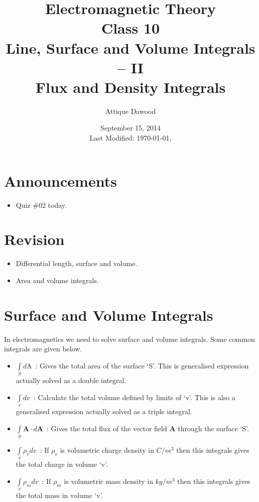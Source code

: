 \documentclass[12pt,a4paper]{article}
\title{Electromagnetic Theory\\Class 10\\Line, Surface and Volume Integrals -- II\\Flux and Density Integrals}
\author{Attique Dawood}
\date{September 15, 2014\\[0.2cm] Last Modified: \today, \currenttime}
\begin{document}
\maketitle
\section{Announcements}
\begin{itemize}
\item Quiz \#02 today.
\end{itemize}
\section{Revision}
\begin{itemize}
\item Differential length, surface and volume.
\item Area and volume integrals.
\end{itemize}
\section{Surface and Volume Integrals}
In electromagnetics we need to solve surface and volume integrals. Some common integrals are given below.
\begin{itemize}
\item $\int\limits_{S} d\mathrm{A}$~: Gives the total area of the surface `S'. This is generalised expression actually solved as a double integral.
\item $\int\limits_{v} dv$~: Calculate the total volume defined by limits of `v'. This is also a generalised expression actually solved as a triple integral.
\item $\int\limits_{S}\textbf{A}\cdot d\textbf{A}$~: Gives the total flux of the vector field \textbf{A} through the surface `S'.
\item $\int\limits_{v}\rho_v dv$~: If $\rho_v$ is volumetric charge density in $C/m^3$ then this integrals gives the total charge in volume `v'.
\item $\int\limits_{v}\rho_m dv$~: If $\rho_m$ is volumetric mass density in $kg/m^3$ then this integrals gives the total mass in volume `v'.
\end{itemize}
\end{document}
